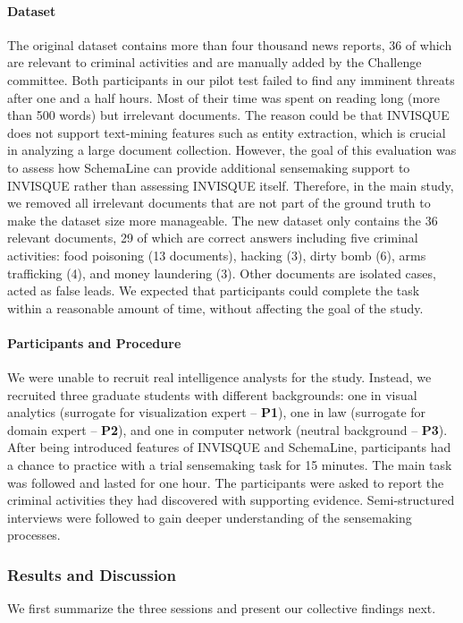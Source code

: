 \paragraph{Dataset}
The original dataset contains more than four thousand news reports, 36 of which are relevant to criminal activities and are manually added by the Challenge committee. Both participants in our pilot test failed to find any imminent threats after one and a half hours. Most of their time was spent on reading long (more than 500 words) but irrelevant documents. The reason could be that INVISQUE does not support text-mining features such as entity extraction, which is crucial in analyzing a large document collection. However, the goal of this evaluation was to assess how SchemaLine can provide additional sensemaking support to INVISQUE rather than assessing INVISQUE itself. Therefore, in the main study, we removed all irrelevant documents that are not part of the ground truth to make the dataset size more manageable. The new dataset only contains the 36 relevant documents, 29 of which are correct answers including five criminal activities: food poisoning (13 documents), hacking (3), dirty bomb (6), arms trafficking (4), and money laundering (3). Other documents are isolated cases, acted as false leads. We expected that participants could complete the task within a reasonable amount of time, without affecting the goal of the study.

\paragraph{Participants and Procedure}
We were unable to recruit real intelligence analysts for the study. Instead, we recruited three graduate students with different backgrounds:  one in visual analytics (surrogate for visualization expert -- \textbf{P1}), one in law (surrogate for domain expert -- \textbf{P2}), and one in computer network (neutral background -- \textbf{P3}). After being introduced features of INVISQUE and SchemaLine, participants had a chance to practice with a trial sensemaking task for 15 minutes. The main task was followed and lasted for one hour. The participants were asked to report the criminal activities they had discovered with supporting evidence. Semi-structured interviews were followed to gain deeper understanding of the sensemaking processes.

\subsubsection{Results and Discussion}
We first summarize the three sessions and present our collective findings next.

